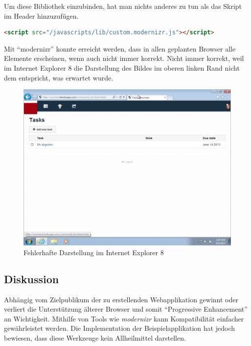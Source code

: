 Um diese Bibliothek einzubinden, hat man nichts anderes zu tun als das Skript im Header hinzuzufügen.

\begin{lstlisting}[language=HTML, caption=Einbinden von modernizr \cite{roomiesLayout}, firstnumber=12, label=lst:mdernizrLayoutServer]
<script src="/javascripts/lib/custom.modernizr.js"></script>
\end{lstlisting}

Mit ``modernizr'' konnte erreicht werden, dass in allen geplanten Browser alle Elemente erscheinen, wenn auch nicht immer korrekt. Nicht immer korrekt, weil im Internet Explorer 8 die Darstellung des Bildes im oberen linken Rand nicht dem entspricht, was erwartet wurde.

\begin{figure}[H]
	\centering
	\includegraphics[width=12cm]{content/principle-demonstration/images/progressive-enhancement-ie8.png}
	\caption{Fehlerhafte Darstellung im Internet Explorer 8}
	\label{fig:iossafari-datepicker}
\end{figure}

\subsection*{Diskussion}
Abhängig vom Zielpublikum der zu erstellenden Webapplikation gewinnt oder verliert die Unterstützung älterer Browser und somit ``Progressive Enhancement'' an Wichtigkeit. Mithilfe von Tools wie \emph{modernizr} kann Kompatibilität einfacher gewährleistet werden. Die Implementation der Beispielapplikation hat jedoch bewiesen, dass diese Werkzeuge kein Allheilmittel darstellen.

